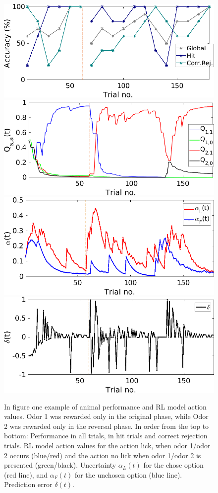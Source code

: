 \begin{figure}
    \centering
    \includegraphics[scale=0.42]{figures/PerfEndrevAn1.png}
    \includegraphics[scale=0.42]{figures/QValuesEndrevAn1.png}
    \includegraphics[scale=0.42]{figures/AlphaEndrevAn1.png}
    \includegraphics[scale=0.42]{figures/DeltaEndrevAn1.png}
    \caption{In figure one example of animal performance and RL model action
values. Odor 1 was rewarded only in the original phase, while Odor 2 was rewarded
only in the reversal phase. In order from the top to bottom: Performance in all trials, in hit trials and correct rejection trials. RL model action values for the action lick, when odor 1/odor 2 occurs (blue/red) and the action no lick when odor 1/odor 2 is presented
(green/black). Uncertainty $\alpha_L(t)$ for the chose option (red line), and $\alpha_F(t)$ for the unchosen option (blue line). Prediction error $\delta(t)$.}
    \label{fig:L-Fmodel}
\end{figure}
